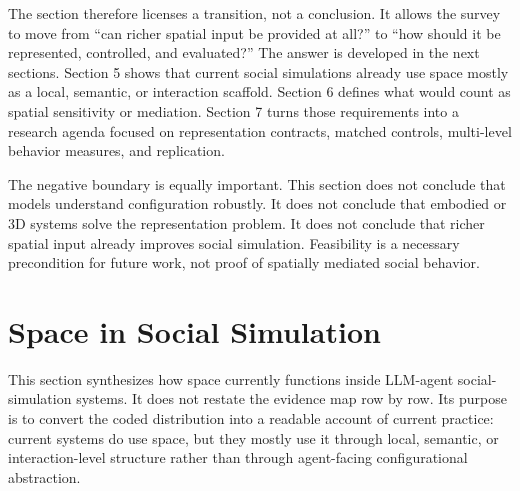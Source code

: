 \documentclass[
  twocolumn]{article}
\begin{document}
The section therefore licenses a transition, not a conclusion. It allows
the survey to move from ``can richer spatial input be provided at all?''
to ``how should it be represented, controlled, and evaluated?'' The
answer is developed in the next sections. Section 5 shows that current
social simulations already use space mostly as a local, semantic, or
interaction scaffold. Section 6 defines what would count as spatial
sensitivity or mediation. Section 7 turns those requirements into a
research agenda focused on representation contracts, matched controls,
multi-level behavior measures, and replication.

The negative boundary is equally important. This section does not
conclude that models understand configuration robustly. It does not
conclude that embodied or 3D systems solve the representation problem.
It does not conclude that richer spatial input already improves social
simulation. Feasibility is a necessary precondition for future work, not
proof of spatially mediated social behavior.

\section{Space in Social Simulation}\label{space-in-social-simulation}

This section synthesizes how space currently functions inside LLM-agent
social-simulation systems. It does not restate the evidence map row by
row. Its purpose is to convert the coded distribution into a readable
account of current practice: current systems do use space, but they
mostly use it through local, semantic, or interaction-level structure
rather than through agent-facing configurational abstraction.
\end{document}

